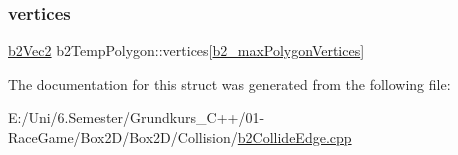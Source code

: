 \mbox{\label{structb2_temp_polygon_a7351a98f6052d1fce66e11bfc5b98a3a}} 
\subsubsection{\texorpdfstring{vertices}{vertices}}
{\footnotesize\ttfamily \mbox{\hyperlink{structb2_vec2}{b2\+Vec2}} b2\+Temp\+Polygon\+::vertices\mbox{[}\mbox{\hyperlink{b2_settings_8h_a09d71ee1993bee28b5b2e6d893b41884}{b2\+\_\+max\+Polygon\+Vertices}}\mbox{]}}



The documentation for this struct was generated from the following file\+:\begin{DoxyCompactItemize}
\item 
E\+:/\+Uni/6.\+Semester/\+Grundkurs\+\_\+\+C++/01-\/\+Race\+Game/\+Box2\+D/\+Box2\+D/\+Collision/\mbox{\hyperlink{b2_collide_edge_8cpp}{b2\+Collide\+Edge.\+cpp}}\end{DoxyCompactItemize}
